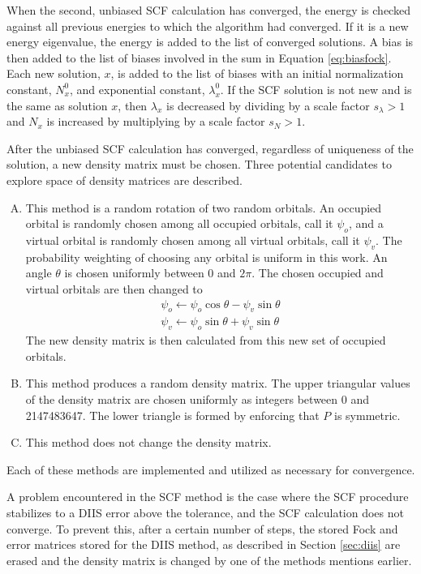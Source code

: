 \documentclass[final,3p,times,twocolumn]{elsarticle}
\begin{document}
When the second, unbiased SCF calculation has converged, the energy is checked against all previous energies to which the algorithm had converged. If it is a new energy eigenvalue, the energy is added to the list of converged solutions. A bias is then added to the list of biases involved in the sum in Equation \eqref{eq:biasfock}. Each new solution, $x$, is added to the list of biases with an initial normalization constant, $N_x^0$, and exponential constant, $\lambda_x^0$. If the SCF solution is not new and is the same as solution $x$, then $\lambda_x$ is decreased by dividing by a scale factor $s_\lambda > 1$ and $N_x$ is increased by multiplying by a scale factor $s_N > 1$.

After the unbiased SCF calculation has converged, regardless of uniqueness of the solution, a new density matrix must be chosen. Three potential candidates to explore space of density matrices are described.
\begin{enumerate}[A.]
\item This method is a random rotation of two random orbitals. An occupied orbital is randomly chosen among all occupied orbitals, call it $\psi_o$, and a virtual orbital is randomly chosen among all virtual orbitals, call it $\psi_v$. The probability weighting of choosing any orbital is uniform in this work. An angle $\theta$ is chosen uniformly between $0$ and $2\pi$. The chosen occupied and virtual orbitals are then changed to
\begin{subequations}
\begin{gather}
\psi_o \leftarrow \psi_o \cos\theta - \psi_v \sin\theta \\
\psi_v \leftarrow \psi_o \sin\theta + \psi_v \sin\theta
\end{gather} 
\end{subequations}
The new density matrix is then calculated from this new set of occupied orbitals.

\item This method produces a random density matrix. The upper triangular values of the density matrix are chosen uniformly as integers between 0 and 2147483647. The lower triangle is formed by enforcing that $P$ is symmetric.

\item This method does not change the density matrix.
\end{enumerate}
Each of these methods are implemented and utilized as necessary for convergence.

A problem encountered in the SCF method is the case where the SCF procedure stabilizes to a DIIS error above the tolerance, and the SCF calculation does not converge. To prevent this, after a certain number of steps, the stored Fock and error matrices stored for the DIIS method, as described in Section \ref{sec:diis} are erased and the density matrix is changed by one of the methods mentions earlier.
\end{document}
